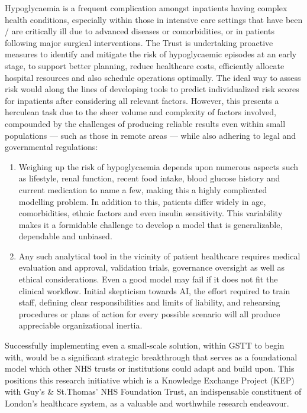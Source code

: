 \vspace{10pt}
\par{\noindent Hypoglycaemia is a frequent complication amongst inpatients having complex health conditions, especially within those in intensive care settings that have been / are critically ill due to advanced diseases or comorbidities, or in patients following major surgical interventions. The Trust is undertaking proactive measures to identify and mitigate the risk of hypoglycaemic episodes at an early stage, to support better planning, reduce healthcare costs, efficiently allocate hospital resources and also schedule operations optimally. The ideal way to assess risk would along the lines of developing tools to predict individualized risk scores for inpatients after considering all relevant factors. However, this presents a herculean task due to the sheer volume and complexity of factors involved, compounded by the challenges of producing reliable results even within small populations — such as those in remote areas — while also adhering to legal and governmental regulations: 
\begin{enumerate}
	\item Weighing up the risk of hypoglycaemia depends upon numerous aspects such as lifestyle, renal function, recent food intake, blood glucose history and current medication to name a few, making this a highly complicated modelling problem. In addition to this, patients differ widely in age, comorbidities, ethnic factors and even insulin sensitivity. This variability makes it a formidable challenge to develop a model that is generalizable, dependable and unbiased.
	\item Any such analytical tool in the vicinity of patient healthcare requires medical evaluation and approval, validation trials, governance oversight as well as ethical considerations. Even a good model may fail if it does not fit the clinical workflow. Initial skepticism towards AI, the effort required to train staff, defining clear responsibilities and limits of liability, and rehearsing procedures or plans of action for every possible scenario will all produce appreciable organizational inertia.
\end{enumerate}
}

\vspace{10pt}
\par{\noindent Successfully implementing even a small-scale solution, within GSTT to begin with, would be a significant strategic breakthrough that serves as a foundational model which other NHS trusts or institutions could adapt and build upon. This positions this research initiative which is a Knowledge Exchange Project (KEP) with Guy’s \& St.Thomas’ NHS Foundation Trust, an indispensable constituent of London's healthcare system, as a valuable and worthwhile research endeavour.}


